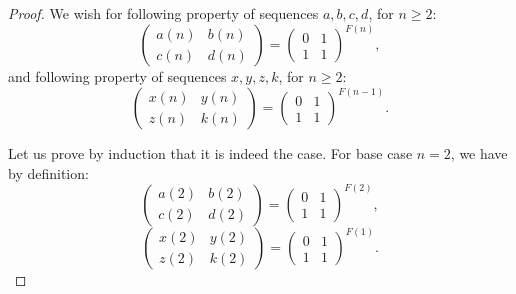 \documentclass[en]{pracamgr}
\theoremstyle{definition}
\begin{document}
\begin{proof}
    We wish for following property of sequences $a,b,c,d$, for $n \geq 2$:
    $$
    \begin{pmatrix}
        a(n) & b(n)\\ 
        c(n) & d(n)
    \end{pmatrix} =
    \begin{pmatrix}
        0 & 1\\ 
        1 & 1
    \end{pmatrix}^{F(n)},
    $$
    and following property of sequences $x,y,z,k$, for $n \geq 2$:
    $$
    \begin{pmatrix}
        x(n) & y(n)\\ 
        z(n) & k(n)
    \end{pmatrix} =
    \begin{pmatrix}
        0 & 1\\ 
        1 & 1
    \end{pmatrix}^{F(n-1)}.
    $$

    Let us prove by induction that it is indeed the case. For base case $n=2$, we have by definition:
    $$
    \begin{pmatrix}
        a(2) & b(2)\\ 
        c(2) & d(2)
    \end{pmatrix} =
    \begin{pmatrix}
        0 & 1\\ 
        1 & 1
    \end{pmatrix}^{F(2)},
    $$
    $$
    \begin{pmatrix}
        x(2) & y(2)\\ 
        z(2) & k(2)
    \end{pmatrix} =
    \begin{pmatrix}
        0 & 1\\ 
        1 & 1
    \end{pmatrix}^{F(1)}.
    $$


\end{proof}
\end{document}

